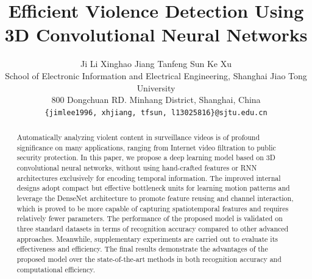\documentclass[10pt,twocolumn,letterpaper]{article}
\begin{document}
\title{Efficient Violence Detection Using 3D Convolutional Neural Networks}

\author{Ji Li \quad Xinghao Jiang \quad Tanfeng Sun \quad Ke Xu\\
School of Electronic Information and Electrical Engineering, Shanghai Jiao Tong University\\
800 Dongchuan RD. Minhang District, Shanghai, China\\
{\tt\small \{jimlee1996, xhjiang, tfsun, l13025816\}@sjtu.edu.cn}
}

\maketitle

\begin{abstract}
Automatically analyzing violent content in surveillance videos is of profound significance on many applications, ranging from Internet video filtration to public security protection. In this paper, we propose a deep learning model based on 3D convolutional neural networks, without using hand-crafted features or RNN architectures exclusively for encoding temporal information. The improved internal designs adopt compact but effective bottleneck units for learning motion patterns and leverage the DenseNet architecture to promote feature reusing and channel interaction, which is proved to be more capable of capturing spatiotemporal features and requires relatively fewer parameters. The performance of the proposed model is validated on three standard datasets in terms of recognition accuracy compared to other advanced approaches. Meanwhile, supplementary experiments are carried out to evaluate its effectiveness and efficiency. The final results demonstrate the advantages of the proposed model over the state-of-the-art methods in both recognition accuracy and computational efficiency.
\end{abstract}

\end{document}
